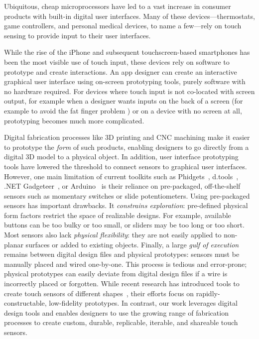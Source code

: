 
Ubiquitous, cheap microprocessors have led to a vast increase in consumer products with built-in digital user interfaces. Many of these devices---thermostats, game controllers, and personal medical devices, to name a few---rely on touch sensing to provide input to their user interfaces.

While the rise of the iPhone and subsequent touchscreen-based smartphones has been the most visible use of touch input, these devices rely on software to prototype and create interactions. An app designer can create an interactive graphical user interface using on-screen prototyping tools, purely software with no hardware required. For devices where touch input is not co-located with screen output, for example when a designer wants inputs on the back of a screen (for example to avoid the fat finger problem \cite{baudisch-nanotouch}) or on a device with no screen at all, prototyping becomes much more complicated.

Digital fabrication processes like 3D printing and CNC machining make it easier to prototype the \emph{form} of such products, enabling designers to go directly from a digital 3D model to a physical object. In addition, user interface prototyping tools have lowered the threshold to connect sensors to graphical user interfaces. However, one main limitation of current toolkits such as Phidgets~\cite{greenberg-phidgets}, d.tools~\cite{hartmann-dtools}, .NET Gadgeteer~\cite{villar-gadgeteer}, or Arduino~\cite{arduino} is their reliance on pre-packaged, off-the-shelf sensors such as momentary switches or slide potentiometers. Using pre-packaged sensors has important drawbacks. It {\em constrains exploration}: pre-defined physical form factors restrict the space of realizable designs. For example, available buttons can be too bulky or too small, or sliders may be too long or too short. Most sensors also lack {\em physical flexibility}: they are not easily applied to non-planar surfaces or added to existing objects. Finally, a large {\em gulf of execution} remains between digital design files and physical prototypes: sensors must be manually placed and wired one-by-one. This process is tedious and error-prone; physical prototypes can easily deviate from digital design files if a wire is incorrectly placed or forgotten. While recent research has introduced tools to create touch sensors of different shapes~\cite{holman-tactiletape,hudson-boxes,wimmer-tdr}, their efforts focus on rapidly-constructable, low-fidelity prototypes. In contrast, our work leverages digital design tools and enables designers to use the growing range of fabrication processes to create custom, durable, replicable, iterable, and shareable touch sensors.

